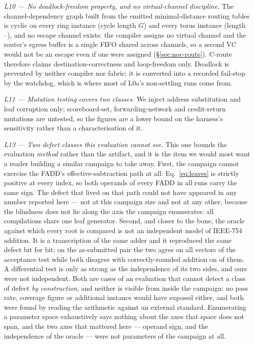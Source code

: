 \documentclass[journal,10pt]{IEEEtran}
\theoremstyle{plain}
\theoremstyle{definition}
\theoremstyle{remark}
\begin{document}
\emph{L10 --- No deadlock-freedom property, and no virtual-channel
discipline.} The channel-dependency graph built from the emitted minimal-distance
routing tables is cyclic on every ring instance (cycle length $G$) and every
torus instance (length \CdgTorusCycLo--\CdgTorusCycHi), and no escape channel
exists: the compiler assigns no virtual channel and the router's egress buffer
is a single FIFO shared across channels, so a second VC would not be an escape
even if one were assigned (\S\ref{sec:noc-route}). \textsf{C-route} therefore
claims destination-correctness and loop-freedom only. Deadlock is prevented by
neither compiler nor fabric; it is converted into a recorded fail-stop by the
watchdog, which is where most of L0a's non-settling runs come from.

\emph{L11 --- Mutation testing covers two classes.} We inject address
substitution and leaf corruption only; scoreboard-set, forwarding-network and
credit-return mutations are untested, so the figures are a lower bound on the
harness's sensitivity rather than a characterisation of it.

\emph{L13 --- Two defect classes this evaluation cannot see.} This one bounds
the evaluation \emph{method} rather than the artifact, and it is the item we
would most want a reader building a similar campaign to take away. First, the
campaign cannot exercise the FADD's effective-subtraction path at all:
Eq.~\eqref{eq:leaves} is strictly positive at every index, so both operands of
every FADD in all \WallTBs{} runs carry the same sign. The defect that lived
on that path could not have appeared in any number reported here --- not at
this campaign size and not at any other, because the blindness does not lie
along the axis the campaign enumerates: all \CompileTotal{} compilations share
one leaf generator. Second, and closer to the bone, the oracle against which
every root is compared is not an independent model of IEEE-754 addition. It is
a transcription of the same adder and it reproduced the same defect bit for
bit; on the as-submitted pair the two agree on all \FpCtrlVectors{} vectors of
the acceptance test while both disagree with correctly-rounded addition on
\FpCtrlErrors{} of them. A differential test is only as strong as the
independence of its two sides, and ours were not independent. Both are cases
of an evaluation that cannot detect a class of defect \emph{by construction},
and neither is visible from inside the campaign: no pass rate, coverage figure
or additional instance would have exposed either, and both were found by
reading the arithmetic against an external standard. Enumerating a parameter
space exhaustively says nothing about the axes that space does not span, and
the two axes that mattered here --- operand sign, and the independence of the
oracle --- were not parameters of the campaign at all.
\end{document}
